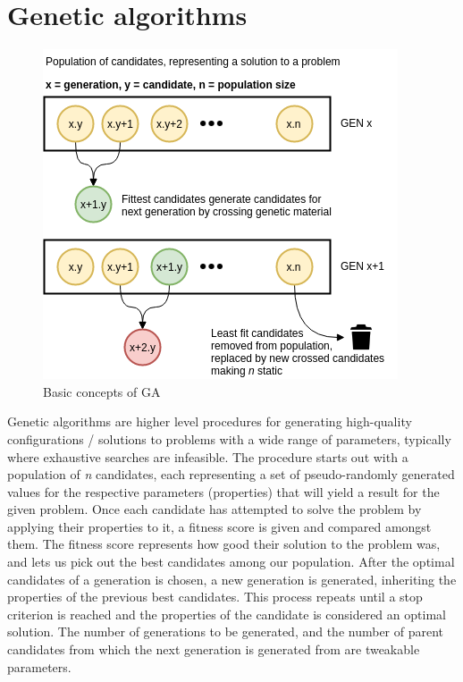 \documentclass[a4paper,english]{report}
\begin{document}
		\section{Genetic algorithms}
			\begin{figure}[H]
				\includegraphics[width=\textwidth]{GA}
				\caption{Basic concepts of GA}
			\end{figure}
			Genetic algorithms are higher level procedures for generating high-quality configurations / solutions to problems with a wide range of parameters, typically where exhaustive searches are infeasible. The procedure starts out with a population of \textit{n} candidates, each representing a set of pseudo-randomly generated values for the respective parameters (properties) that will yield a result for the given problem. Once each candidate has attempted to solve the problem by applying their properties to it, a fitness score is given and compared amongst them. The fitness score represents how good their solution to the problem was, and lets us pick out the best candidates among our population. After the optimal candidates of a generation is chosen, a new generation is generated, inheriting the properties of the previous best candidates. This process repeats until a stop criterion is reached and the properties of the candidate is considered an optimal solution. The number of generations to be generated, and the number of parent candidates from which the next generation is generated from are tweakable parameters.
			
\end{document}
